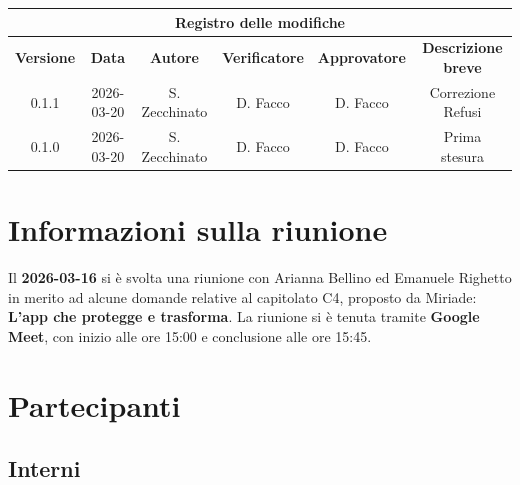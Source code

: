 \documentclass[a4paper, 10pt, colorlinks=true, linkcolor=black, urlcolor=blue, citecolor=blue, hidelinks]{article}
\begin{document}
\newcommand{\tipoverbale}{esterno}
\newcommand{\dataverbale}{2026-03-16}
\newcommand{\dataversione}{2026-03-20}
\newcommand{\versione}{0.1.0}
\newcommand{\stato}{Approvazione}
\newcommand{\destinatari}{The Bitless, prof. T. Vardanega, prof. R. Cardin, Miriade}




\newpage

\begin{center}
    \thispagestyle{empty}
    \begin{tabular}{|c|c|c|c|c|c|}
                    \hline
                    \multicolumn{6}{|c|}{\textbf{Registro delle modifiche}} \\
                    \hline
                    \textbf{Versione} & \textbf{Data} & \textbf{Autore}  & \textbf{Verificatore} & \textbf{Approvatore} & \textbf{Descrizione breve} \\
                    \hline 
                    0.1.1 & \dataversione & S. Zecchinato & D. Facco & D. Facco & Correzione Refusi \\
                    \hline 
                    0.1.0 & 2026-03-20 & S. Zecchinato &  D. Facco  & D. Facco & Prima stesura \\
                    \hline
                \end{tabular}
\end{center}

\newpage

\tableofcontents


\newpage
\section{Informazioni sulla riunione}
Il \textbf{2026-03-16} si è svolta una riunione con Arianna Bellino ed Emanuele Righetto in merito ad alcune domande relative al capitolato C4, proposto da Miriade: \textbf{L'app che protegge e trasforma}. La riunione si è tenuta tramite \textbf{Google Meet}, con inizio alle ore 15:00 e conclusione alle ore 15:45.

\section{Partecipanti}

\subsection{Interni}
\end{document}
